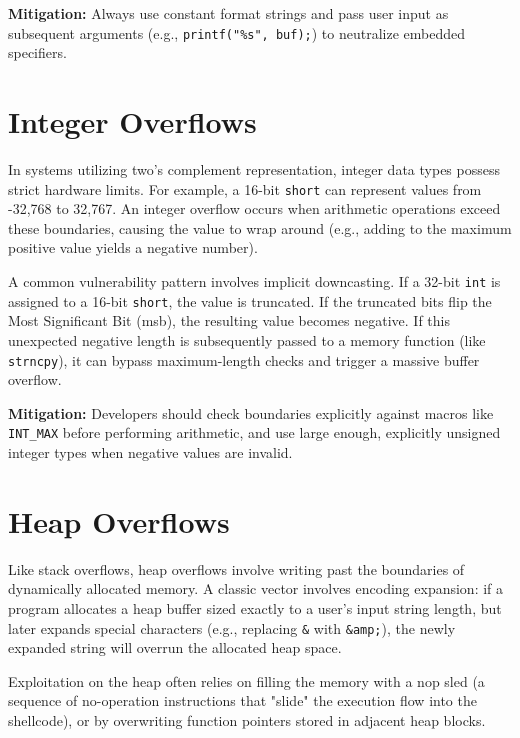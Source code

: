 \textbf{Mitigation:} Always use constant format strings and pass user input as subsequent arguments (e.g., \texttt{printf("\%s", buf);}) to neutralize embedded specifiers.

\section{Integer Overflows}
In systems utilizing two's complement representation, integer data types possess strict hardware limits. For example, a 16-bit \texttt{short} can represent values from -32,768 to 32,767. An integer overflow occurs when arithmetic operations exceed these boundaries, causing the value to wrap around (e.g., adding to the maximum positive value yields a negative number).

A common vulnerability pattern involves implicit downcasting. If a 32-bit \texttt{int} is assigned to a 16-bit \texttt{short}, the value is truncated. If the truncated bits flip the Most Significant Bit (\gls{msb}), the resulting value becomes negative. If this unexpected negative length is subsequently passed to a memory function (like \texttt{strncpy}), it can bypass maximum-length checks and trigger a massive buffer overflow.

\textbf{Mitigation:} Developers should check boundaries explicitly against macros like \texttt{INT\_MAX} before performing arithmetic, and use large enough, explicitly unsigned integer types when negative values are invalid.

\section{Heap Overflows}
Like stack overflows, heap overflows involve writing past the boundaries of dynamically allocated memory. A classic vector involves encoding expansion: if a program allocates a heap buffer sized exactly to a user's input string length, but later expands special characters (e.g., replacing \texttt{\&} with \texttt{\&amp;}), the newly expanded string will overrun the allocated heap space. 

Exploitation on the heap often relies on filling the memory with a \gls{nop} sled (a sequence of no-operation instructions that "slide" the execution flow into the shellcode), or by overwriting function pointers stored in adjacent heap blocks.

